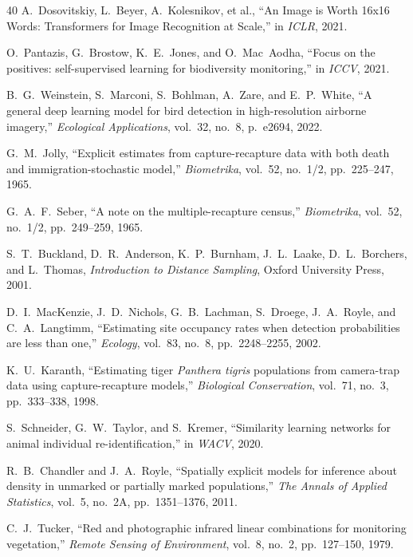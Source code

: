 \begin{thebibliography}{40}
A.~Dosovitskiy, L.~Beyer, A.~Kolesnikov, et al., ``An Image is Worth 16x16 Words: Transformers for Image Recognition at Scale,'' in \emph{ICLR}, 2021.

O.~Pantazis, G.~Brostow, K.~E.~Jones, and O.~Mac~Aodha, ``Focus on the positives: self-supervised learning for biodiversity monitoring,'' in \emph{ICCV}, 2021.

B.~G.~Weinstein, S.~Marconi, S.~Bohlman, A.~Zare, and E.~P.~White, ``A general deep learning model for bird detection in high-resolution airborne imagery,'' \emph{Ecological Applications}, vol.~32, no.~8, p.~e2694, 2022.

G.~M.~Jolly, ``Explicit estimates from capture-recapture data with both death and immigration-stochastic model,'' \emph{Biometrika}, vol.~52, no.~1/2, pp.~225--247, 1965.

G.~A.~F.~Seber, ``A note on the multiple-recapture census,'' \emph{Biometrika}, vol.~52, no.~1/2, pp.~249--259, 1965.

S.~T.~Buckland, D.~R.~Anderson, K.~P.~Burnham, J.~L.~Laake, D.~L.~Borchers, and L.~Thomas, \emph{Introduction to Distance Sampling}, Oxford University Press, 2001.

D.~I.~MacKenzie, J.~D.~Nichols, G.~B.~Lachman, S.~Droege, J.~A.~Royle, and C.~A.~Langtimm, ``Estimating site occupancy rates when detection probabilities are less than one,'' \emph{Ecology}, vol.~83, no.~8, pp.~2248--2255, 2002.

K.~U.~Karanth, ``Estimating tiger \emph{Panthera tigris} populations from camera-trap data using capture-recapture models,'' \emph{Biological Conservation}, vol.~71, no.~3, pp.~333--338, 1998.

S.~Schneider, G.~W.~Taylor, and S.~Kremer, ``Similarity learning networks for animal individual re-identification,'' in \emph{WACV}, 2020.

R.~B.~Chandler and J.~A.~Royle, ``Spatially explicit models for inference about density in unmarked or partially marked populations,'' \emph{The Annals of Applied Statistics}, vol.~5, no.~2A, pp.~1351--1376, 2011.

C.~J.~Tucker, ``Red and photographic infrared linear combinations for monitoring vegetation,'' \emph{Remote Sensing of Environment}, vol.~8, no.~2, pp.~127--150, 1979.


\end{thebibliography}
